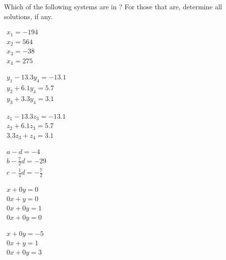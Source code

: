 \begin{exercise}  
Which of the following systems are in ?
For those that are, determine all solutions, if any.
\begin{Parts}
\item \(\begin{array}{l}
x_1=-194\\
x_2=564\\
x_3=-38\\
x_4=275
\end{array}\)

\item \(\begin{array}{l}
y_1-13.3y_4=-13.1\\
y_2+6.1y_4=5.7\\
y_3+3.3y_4=3.1
\end{array}\)

\item \(\begin{array}{l}
z_1-13.3z_3=-13.1\\
z_2+6.1z_3=5.7\\
3.3z_3+z_4=3.1
\end{array}\)

\item \(\begin{array}{l}a-d=-4\\
b-\frac72d=-29\\
c-\frac14d=-\frac72
\end{array}\)

\begin{OmitV1}
\item \(\begin{array}{l}x+0y=0\\
0x+y=0\\
0x+0y=1\\
0x+0y=0
\end{array}\)

\item \(\begin{array}{l}x+0y=-5\\
0x+y=1\\
0x+0y=3
\end{array}\)
\end{OmitV1}

%
%
\end{Parts}
\end{exercise}




